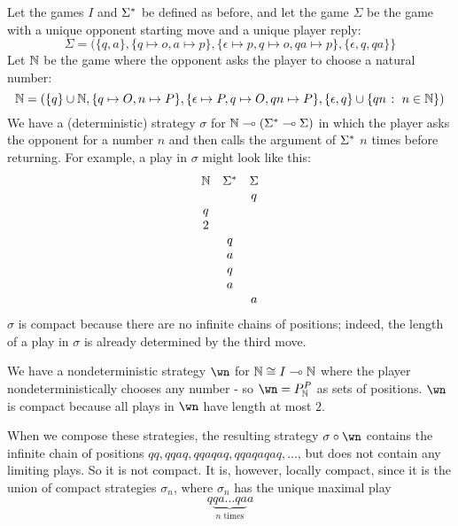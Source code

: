 \documentclass{entcs} \usepackage{prentcsmacro}
\newcommand{\0}{{\mathtt{0}}}
\begin{document}
\begin{example}
  Let the games $I$ and ${\Sigma^*}$ be defined as before, and let the game $\Sigma$ be the game with a unique opponent starting move and a unique player reply:
  \[
    \Sigma = (\{q,a\}, \{q\mapsto o, a\mapsto p\}, \{\epsilon\mapsto p,q\mapsto o,qa\mapsto p\}, \{\epsilon, q, qa\}\}
    \]
  Let $\mathbb{N}$ be the game where the opponent asks the player to choose a natural number:
  \[
    \mathbb{N} = \left(\{q\} \cup \mathbb{N}, \{q\mapsto O, n\mapsto P\}, \{\epsilon\mapsto P,q\mapsto O,qn\mapsto P\}, \{\epsilon, q\} \cup \{qn\;\colon\; n\in\mathbb{N}\}\right)
    \]
  We have a (deterministic) strategy $\sigma$ for $\mathbb{N}\multimap ({\Sigma^*}\multimap\Sigma)$ in which the player asks the opponent for a number $n$ and then calls the argument of ${\Sigma^*}$ $n$ times before returning.  For example, a play in $\sigma$ might look like this:
  \[
    \begin{array}{ccc}
      \mathbb{N} & {\Sigma^*} & \Sigma \\
      & & q \\
      q & & \\
      2 & & \\
      & q & \\
      & a & \\
      & q & \\
      & a & \\
      & & a
    \end{array}
    \]
  $\sigma$ is compact because there are no infinite chains of positions; indeed, the length of a play in $\sigma$ is already determined by the third move.  

  We have a nondeterministic strategy $\wn$ for $\mathbb{N}\cong I\multimap\mathbb{N}$ where the player nondeterministically chooses any number - so $\wn = P_{\bN}^P$ as sets of positions.  $\wn$ is compact because all plays in $\wn$ have length at most $2$.  

  When we compose these strategies, the resulting strategy $\comp\sigma\wn$ contains the infinite chain of positions $qq,qqaq,qqaqaq,qqaqaqaq,\dots$, but does not contain any limiting plays.  So it is not compact.  It is, however, locally compact, since it is the union of compact strategies $\sigma_n$, where $\sigma_n$ has the unique maximal play
  \[
    q\underbrace{qa\dots qa}_{\textrm{$n$ times}}a
    \]
\end{example}
\end{document}
